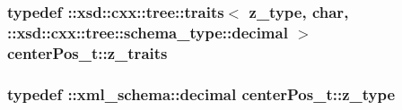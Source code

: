 \hypertarget{classcenterPos__t_a4dd2aec563bb681d33444f495887ebb8}{
\subsubsection[{z\-\_\-traits}]{\setlength{\rightskip}{0pt plus 5cm}typedef \-::xsd\-::cxx\-::tree\-::traits$<$ {\bf z\-\_\-type}, char, \-::xsd\-::cxx\-::tree\-::schema\-\_\-type\-::decimal $>$ {\bf center\-Pos\-\_\-t\-::z\-\_\-traits}}}\label{classcenterPos__t_a4dd2aec563bb681d33444f495887ebb8}
\hypertarget{classcenterPos__t_a6c424433a912263b9c8644a89ad14082}{
\subsubsection[{z\-\_\-type}]{\setlength{\rightskip}{0pt plus 5cm}typedef \-::{\bf xml\-\_\-schema\-::decimal} {\bf center\-Pos\-\_\-t\-::z\-\_\-type}}}\label{classcenterPos__t_a6c424433a912263b9c8644a89ad14082}


